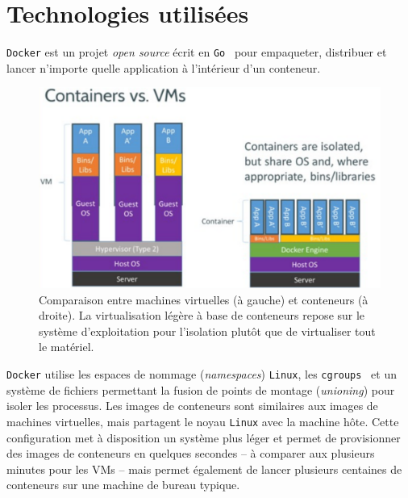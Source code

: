 \documentclass[a4paper]{article}
\begin{document}
\section*{Technologies utilis\'ees}

\texttt{Docker} est un projet \emph{open source} \'ecrit en
\texttt{Go}~\cite{ref-golang} pour empaqueter, distribuer et lancer n'importe
quelle application \`a l'int\'erieur d'un conteneur.

\begin{figure}[h]
\begin{center}
\includegraphics[width=0.8\linewidth]{figs/vm-lxc.pdf}
\end{center}
\caption{\label{fig-docker-overview}Comparaison entre machines virtuelles (\`a
	gauche) et conteneurs (\`a droite).
La virtualisation l\'eg\`ere \`a base de conteneurs repose sur le syst\`eme
d'exploitation pour l'isolation plut\^ot que de virtualiser tout le
mat\'eriel.}
\end{figure}
 
\texttt{Docker} utilise les espaces de nommage (\emph{namespaces})
\texttt{Linux}, les \texttt{cgroups}~\cite{ref-cgroups} et un syst\`eme de
fichiers permettant la fusion de points de montage (\emph{unioning}) pour isoler
les processus.
Les images de conteneurs sont similaires aux images de machines virtuelles, mais
partagent le noyau \texttt{Linux} avec la machine h\^ote.
Cette configuration met \`a disposition un syst\`eme plus l\'eger et permet de
provisionner des images de conteneurs en quelques secondes -- \`a comparer aux
plusieurs minutes pour les VMs -- mais permet \'egalement de lancer plusieurs
centaines de conteneurs sur une machine de bureau typique.
\end{document}
